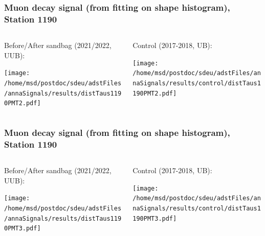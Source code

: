 \documentclass[aspectratio=169]{beamer}
\begin{document}
\begin{frame}
  \frametitle{Muon decay signal (from fitting on shape histogram), Station 1190}
  
  \begin{columns}[T,c]
    \begin{column}{.5\textwidth}
      Before/After sandbag (2021/2022, UUB):
      \vspace{.3cm}

      \texttt{[image: /home/msd/postdoc/sdeu/adstFiles/annaSignals/results/distTaus1190PMT2.pdf]}
    \end{column}
    \begin{column}{.5\textwidth}
      Control  (2017-2018, UB):
      \vspace{0.3cm}

      \texttt{[image: /home/msd/postdoc/sdeu/adstFiles/annaSignals/results/control/distTaus1190PMT2.pdf]}
    \end{column}    
\end{columns}
\end{frame}

\begin{frame}
  \frametitle{Muon decay signal (from fitting on shape histogram), Station 1190}
  
  \begin{columns}[T,c]
    \begin{column}{.5\textwidth}
      Before/After sandbag (2021/2022, UUB):
      \vspace{.3cm}

      \texttt{[image: /home/msd/postdoc/sdeu/adstFiles/annaSignals/results/distTaus1190PMT3.pdf]}
    \end{column}
    \begin{column}{.5\textwidth}
      Control (2017-2018, UB):
      \vspace{0.3cm}

      \texttt{[image: /home/msd/postdoc/sdeu/adstFiles/annaSignals/results/control/distTaus1190PMT3.pdf]}
    \end{column}    
\end{columns}
\end{frame}

\end{document}
